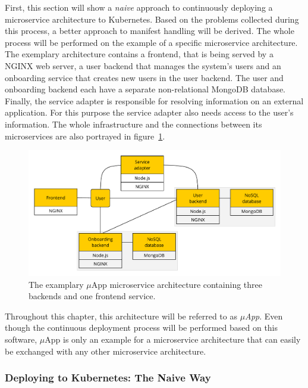 First, this section will show a \textit{naive} approach to continuously
deploying a microservice architecture to Kubernetes. Based on the problems
collected during this process, a better approach to manifest handling will be
derived. The whole process will be performed on the example of a specific
microservice architecture. The exemplary architecture contains a frontend, that
is being served by a NGINX web server, a user backend that manages the system's
users and an onboarding service that creates new users in the user backend. The
user and onboarding backend each have a separate non-relational MongoDB
database. Finally, the service adapter is responsible for resolving information
on an external application. For this purpose the service adapter also needs
access to the user's information. The whole infrastructure and the connections
between its microservices are also portrayed in figure~\ref{fig:dsp_excerpt}.

\begin{figure}[H]
\begin{center}
  \includegraphics[scale=0.6]{images/figures/dspIT_excerpt.pdf}
\end{center}
\caption{The examplary $\mu$App microservice architecture containing three
backends and one frontend service.}%
\label{fig:dsp_excerpt}
\end{figure}

Throughout this chapter, this architecture will be referred to as
\textit{$\mu$App}. Even though the continuous deployment process will be
performed based on this software, $\mu$App is only an example for a
microservice architecture that can easily be exchanged with any other
microservice architecture.

\subsubsection{Deploying to Kubernetes: The Naive Way}%
\label{ssub:Deploying_to_Kubernetes_The_Naive_Way}

